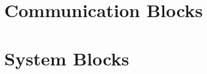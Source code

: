 \documentclass{report}
\begin{document}
\chapter{Communication Blocks}

\newpage

\newpage
 
\chapter{System Blocks}

\newpage

\newpage

\newpage

\newpage

\newpage

\newpage

\newpage

\newpage
 
\end{document}
